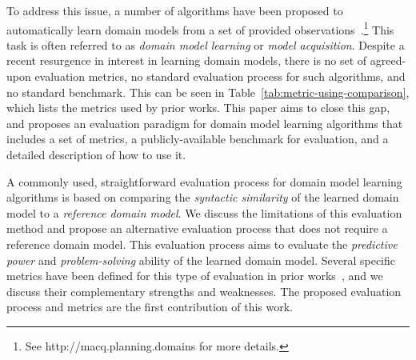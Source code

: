 \documentclass[letterpaper]{article} %
\newif\ifaddcomments
\newcommand{\roni}[1]{\ifaddcomments{\textcolor{red}{[Roni: #1]}}\fi}
\newcommand{\yarin}[1]{\ifaddcomments{\textcolor{teal}{[Yarin: #1]}}\fi}
\newcommand{\cm}[1]{\ifaddcomments{\textcolor{olive}{[Christian: #1]}}\fi}
\begin{document}
To address this issue, a number of algorithms have been proposed to automatically learn domain models from a set of provided observations~\citep{macq,aineto2019learning,jimenez2012review}.\footnote{See http://macq.planning.domains for more details.} 
This task is often referred to as \emph{domain model learning} or \emph{model acquisition}. %
Despite a recent resurgence in interest in learning domain models, there is 
no set of agreed-upon evaluation metrics, 
no standard evaluation process for such algorithms, 
and no standard benchmark. This can be seen in Table~\ref{tab:metric-using-comparison}, which lists the metrics used by prior works. 
This paper aims to close this gap, and proposes an evaluation paradigm for domain model learning algorithms that includes a set of metrics, a publicly-available benchmark for evaluation, and a detailed description of how to use it. 




A commonly used, straightforward evaluation process for domain model learning algorithms is based on comparing the \emph{syntactic similarity} of the learned domain model to a \emph{reference domain model}. 
We discuss the limitations of this evaluation method and propose an alternative evaluation process that does not require a reference domain model. 
This evaluation process aims to evaluate the \emph{predictive power} and \emph{problem-solving} ability of the learned domain model. 
Several specific metrics have been defined for this type of evaluation in prior works~\citep{aineto2019learning,juba2021safe,mordoch2024safe,Oswald2024DLLMDomainModeling}, and we discuss their complementary strengths and weaknesses. 
The proposed evaluation process and metrics are the first contribution of this work.
\end{document}
